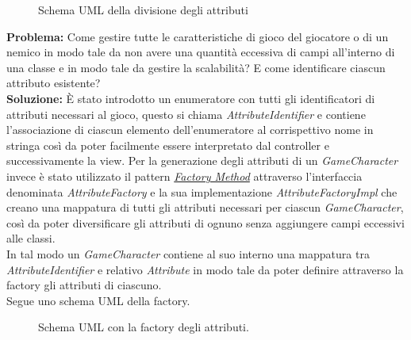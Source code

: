 \documentclass[a4paper,12pt]{report}
\begin{document}
\begin{figure}[H]
	\centering
	
	\caption{Schema UML della divisione degli attributi}
	\label{fig:Schema UML della divisione degli attributi}
\end{figure}

\textbf{Problema:} Come gestire tutte le caratteristiche di gioco del giocatore o di un nemico in modo tale da non avere una quantità eccessiva di campi all'interno di una classe e in modo tale da gestire la scalabilità? E come identificare ciascun attributo esistente?\\
\textbf{Soluzione:} È stato introdotto un enumeratore con tutti gli identificatori di attributi necessari al gioco, questo si chiama \textit{AttributeIdentifier} e contiene l'associazione di ciascun elemento dell'enumeratore al corrispettivo nome in stringa così da poter facilmente essere interpretato dal controller e successivamente la view.
Per la generazione degli attributi di un \textit{GameCharacter} invece è stato utilizzato il pattern \href{https://refactoring.guru/design-patterns/factory-method}{\textit{Factory Method}} attraverso l'interfaccia denominata \textit{AttributeFactory} e la sua implementazione \textit{AttributeFactoryImpl} che creano una mappatura di tutti gli attributi necessari per ciascun \textit{GameCharacter}, così da poter diversificare gli attributi di ognuno senza aggiungere campi eccessivi alle classi.\\
In tal modo un \textit{GameCharacter} contiene al suo interno una mappatura tra \textit{AttributeIdentifier} e relativo \textit{Attribute} in modo tale da poter definire attraverso la factory gli attributi di ciascuno.\\ Segue uno schema UML della factory.\\

\begin{figure}[H]
	\centering
	
	\caption{Schema UML con la factory degli attributi.}
	\label{fig:Schema UML con la factory degli attributi.}
\end{figure}
\end{document}
